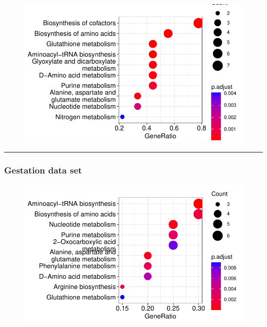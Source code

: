 \documentclass[
  24px,
  letterpaper,
  DIV=11,
  numbers=noendperiod]{scrartcl}
\newenvironment{Shaded}{\begin{snugshade}}{\end{snugshade}}
\newcommand{\AttributeTok}[1]{\textcolor[rgb]{0.40,0.45,0.13}{#1}}
\newcommand{\FunctionTok}[1]{\textcolor[rgb]{0.28,0.35,0.67}{#1}}
\newcommand{\NormalTok}[1]{\textcolor[rgb]{0.00,0.23,0.31}{#1}}
\newcommand{\OtherTok}[1]{\textcolor[rgb]{0.00,0.23,0.31}{#1}}
\newcommand{\SpecialCharTok}[1]{\textcolor[rgb]{0.37,0.37,0.37}{#1}}
\begin{document}
\begin{figure}[H]

{\centering \includegraphics{index_files/figure-pdf/unnamed-chunk-14-1.pdf}

}

\end{figure}

\begin{center}\rule{0.5\linewidth}{0.5pt}\end{center}

\hypertarget{gestation-data-set}{%
\subsubsection{Gestation data set}\label{gestation-data-set}}

\begin{Shaded}
\end{Shaded}

\begin{figure}[H]

{\centering \includegraphics{index_files/figure-pdf/unnamed-chunk-15-1.pdf}

}

\end{figure}
\end{document}
